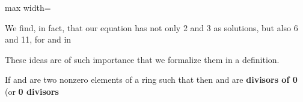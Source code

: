 \documentclass[11pt,oneside]{article}
\begin{document}
\begin{BookBody}
\begin{center}\begin{adjustbox}{max width=\linewidth}\end{adjustbox}\end{center}

\noindent We find, in fact, that our equation has not only 2 and 3 as solutions, but also 6 and 11, for  and  in \BookEnd{\blacktriangle}

These ideas are of such importance that we formalize them in a definition.

 If  and  are two nonzero elements of a ring  such that  then  and  are \textbf{divisors of 0} (or\textbf{ 0 divisors}\BookEnd{\blacksquare}

\end{BookBody}

\BookNarrativetrue
\end{document}
